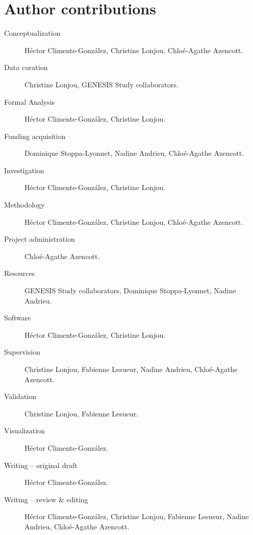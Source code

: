 \documentclass[10pt,letterpaper]{article}
\begin{document}
\section*{Author contributions}

\begin{description}
  \item[Conceptualization] Héctor Climente-González, Christine Lonjou, Chloé-Agathe Azencott.
  \item[Data curation] Christine Lonjou, GENESIS Study collaborators.
  \item[Formal Analysis] Héctor Climente-González, Christine Lonjou.
  \item[Funding acquisition] Dominique Stoppa-Lyonnet, Nadine Andrieu, Chloé-Agathe Azencott.
  \item[Investigation] Héctor Climente-González, Christine Lonjou.
  \item[Methodology] Héctor Climente-González, Christine Lonjou, Chloé-Agathe Azencott.
  \item[Project administration] Chloé-Agathe Azencott.
  \item[Resources] GENESIS Study collaborators, Dominique Stoppa-Lyonnet, Nadine Andrieu.
  \item[Software] Héctor Climente-González, Christine Lonjou.
  \item[Supervision] Christine Lonjou, Fabienne Lesueur, Nadine Andrieu, Chloé-Agathe Azencott.
  \item[Validation] Christine Lonjou, Fabienne Lesueur.
  \item[Visualization] Héctor Climente-González.
  \item[Writing – original draft] Héctor Climente-González.
  \item[Writing – review \& editing] Héctor Climente-González, Christine Lonjou, Fabienne Lesueur, Nadine Andrieu, Chloé-Agathe Azencott.
\end{description}

\nolinenumbers



%
%
% 
\end{document}
